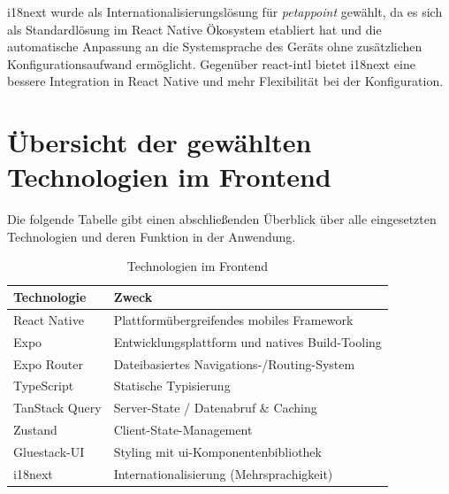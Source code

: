 i18next wurde als Internationalisierungslösung für \textit{petappoint} gewählt, 
da es sich als Standardlösung im React Native Ökosystem etabliert hat 
und die automatische Anpassung an die Systemsprache des Geräts ohne 
zusätzlichen Konfigurationsaufwand ermöglicht. Gegenüber react-intl 
bietet i18next eine bessere Integration in React Native und mehr 
Flexibilität bei der Konfiguration.

\section{Übersicht der gewählten Technologien im Frontend}

Die folgende Tabelle gibt einen abschließenden Überblick über alle eingesetzten Technologien und deren Funktion in der Anwendung.

\begin{table}[H]
\begin{tabular}{|p{5cm}|p{9cm}|}
\hline
\textbf{Technologie} & \textbf{Zweck} \\
\hline
React Native & Plattformübergreifendes mobiles Framework \\
\hline
Expo & Entwicklungsplattform und natives Build-Tooling \\
\hline
Expo Router & Dateibasiertes Navigations-/Routing-System \\
\hline
TypeScript & Statische Typisierung \\
\hline
TanStack Query & Server-State / Datenabruf \& Caching \\
\hline
Zustand & Client-State-Management \\
\hline
Gluestack-UI & Styling mit \gls{ui}-Komponentenbibliothek \\
\hline
i18next & Internationalisierung (Mehrsprachigkeit) \\
\hline
\end{tabular}
\caption{Technologien im Frontend}
\end{table}